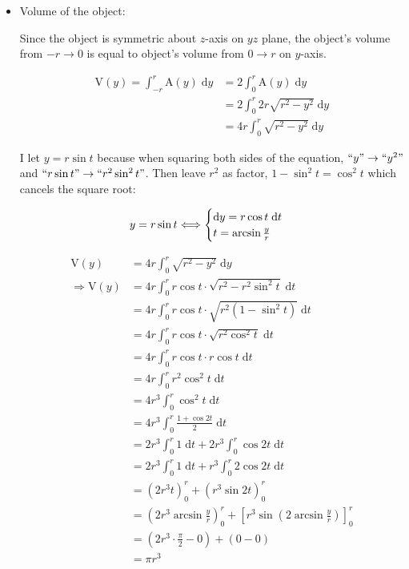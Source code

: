 \documentclass[12pt]{article}
\begin{document}
\begin{enumerate}
\begin{itemize}
    \item Volume of the object: \par
    Since the object is symmetric about $z$-axis on $yz$ plane, the object's volume from $-r \to 0$ is equal to object's volume from $0\to r$ on $y$-axis. \par
    \begin{align*}
    \mathrm{V}(y) = \int_{-r}^r \mathrm{A}(y)\; \mathrm{d}y
    &=2 \int_{0}^r \mathrm{A}(y)\; \mathrm{d}y \\
    &=2 \int_{0}^r 2r\sqrt{r^2-y^2} \; \mathrm{d}y\\
    &=4r \int_{0}^r \sqrt{r^2-y^2} \; \mathrm{d}y
    \end{align*}
    
    I let $y=r\sin{t}$ because when squaring both sides of the equation, $``y"\to ``y^2"$ and $``r\sin{t}"\to ``r^2\sin^2{t}"$. Then leave $r^2$ as factor, $1-\sin^2{t}=\cos^2{t}$ which cancels the square root: \par
    \begin{equation*}
        y=r\sin{t}\\
        \Longleftrightarrow
        \begin{cases}
            \mathrm{d}y = r \cos{t}\; \mathrm{d}t\\
            t=\arcsin{\frac{y}{r}}
        \end{cases}
    \end{equation*}
    
    
    \begin{align*}
    \mathrm{V}(y) &= 4r \int_{0}^r \sqrt{r^2-y^2} \; \mathrm{d}y \\
    \Longrightarrow \mathrm{V}(y)&= 4r \int_{0}^r r\cos{t}\cdot\sqrt{r^2-r^2\sin^2{t}} \; \mathrm{d}t \\
    &= 4r \int_{0}^r r\cos{t}\cdot \sqrt{r^2 \left(1-\sin^2{t}\right)} \; \mathrm{d}t \\
    &= 4r \int_{0}^r r\cos{t}\cdot\sqrt{r^2 \cos^2{t}} \; \mathrm{d}t \\
    &= 4r \int_{0}^r r\cos{t}\cdot r \cos{t} \; \mathrm{d}t \\
    &= 4r \int_{0}^r r^2 \cos^2{t}\; \mathrm{d}t \\
    &= 4r^3 \int_{0}^r \cos^2{t}\; \mathrm{d}t \\
    &= 4r^3 \int_{0}^r \frac{1+\cos{2t}}{2}\; \mathrm{d}t \\
    &= 2r^3\int_{0}^r 1\; \mathrm{d}t +2r^3 \int_{0}^r \cos{2t}\; \mathrm{d}t \\
    &= 2r^3\int_{0}^r 1\; \mathrm{d}t
    +r^3 \int_{0}^r 2\cos{2t}\; \mathrm{d}t \\
    &= \left(2r^3 t \right)_0^r
    +\left(r^3 \sin{2t} \right)_0^r \\
    &= \left(2r^3 \arcsin{\frac{y}{r}}
    \right)_0^r
    +\left[r^3 \sin{\left( 2\arcsin{\frac{y}{r}} \right)} \right]_0^r \\
    &= \left(2r^3\cdot \frac{\pi}{2}-0 \right)
    +\left(0-0 \right) \\
    &= \pi r^3 \\
    \end{align*}
    

\end{itemize}
\end{enumerate}
\end{document}
